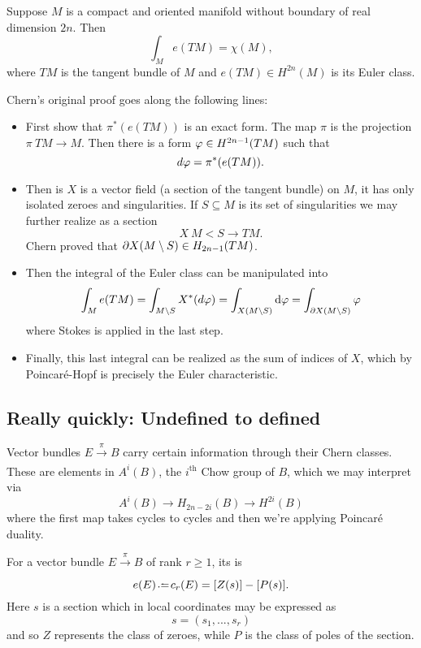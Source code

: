 \documentclass[12pt]{memoir}
\begin{document}
\begin{Th}
Suppose $M$ is a compact and oriented manifold without boundary of real dimension $2n$. Then 
$$\int_Me(TM)=\chi(M),$$
where $TM$ is the tangent bundle of $M$ and $e(TM)\in H^{2n}(M)$ is its Euler class.
\end{Th}

Chern's original proof goes along the following lines:
\begin{itemize}
    \item First show that $\pi^\ast(e(TM))$ is an exact form. The map $\pi$ is the projection $\pi\: TM\to M$. Then there is a form $\varphi\in H^{2n-1}(TM)$ such that 
    $$d\varphi=\pi^\ast(e(TM)).$$
    \item Then is $X$ is a vector field (a section of the tangent bundle) on $M$, it has only isolated zeroes and singularities. If $S\subseteq M$ is its set of singularities we may further realize as a section
    $$X\:M\less S\to TM.$$
    Chern proved that $\partial X(M\setminus S)\in H_{2n-1}(TM)$.
    \item Then the integral of the Euler class can be manipulated into
    $$\int_Me(TM)=\int_{M\setminus S}X^\ast(d\varphi)=\int_{X(M\setminus S)}\dd\varphi=\int_{\partial X(M\setminus S)}\varphi$$
    where Stokes is applied in the last step.
    \item Finally, this last integral can be realized as the sum of indices of $X$, which by Poincaré-Hopf is precisely the Euler characteristic.
\end{itemize}

\subsection{Really quickly: Undefined to defined}

Vector bundles $E\xrightarrow[]{\pi}B$ carry certain information through their Chern classes. These are elements in $A^i(B)$, the $i^{\text{th}}$ Chow group of $B$, which we may interpret via
$$A^i(B)\to H_{2n-2i}(B)\to H^{2i}(B)$$
where the first map takes cycles to cycles and then we're applying Poincaré duality.

\begin{Def}
    For a vector bundle $E\xrightarrow[]{\pi}B$ of rank $r\geq 1$, its  is
    $$e(E)\defeq c_r(E)=[Z(s)]-[P(s)].$$%
    Here $s$ is a section which in local coordinates may be expressed as 
    $$s=(s_1,...,s_r)$$
    and so $Z$ represents the class of zeroes, while $P$ is the class of poles of the section.
\end{Def}
\end{document}

